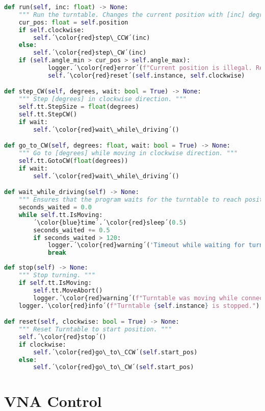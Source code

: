 \begin{lstlisting}[language=Python, caption=Methods for turning the turntable to the wanted position.]
def run(self, inc: float) -> None:
    """ Run the turntable. Changes the current position with [inc] degrees. """
    cur_pos: float = self.position
    if self.clockwise:
        self.´\color{red}step\_CCW´(inc)
    else:
        self.´\color{red}step\_CW´(inc)
    if (self.angle_min > cur_pos > self.angle_max):
            logger.´\color{red}error´(f"Current position is illegal. Resetting: {self.instance}")
            self.´\color{red}reset´(self.instance, self.clockwise)

def step_CW(self, degrees, wait: bool = True) -> None:
    """ Step [degrees] in clockwise direction. """
    self.tt.StepSize = float(degrees)
    self.tt.StepCW()
    if wait:
        self.´\color{red}wait\_while\_driving´()

def go_to_CW(self, degrees: float, wait: bool = True) -> None:
    """ Go to [degrees] while moving in clockwise direction. """
    self.tt.GotoCW(float(degrees))
    if wait:
        self.´\color{red}wait\_while\_driving´()

def wait_while_driving(self) -> None:
    """ Ensures that the program waits for the turntable to reach position before execution further code. """
    seconds_waited = 0.0
    while self.tt.IsMoving:
        ´\color{blue}time´.´\color{red}sleep´(0.5)
        seconds_waited += 0.5
        if seconds_waited > 120:
            logger.´\color{red}warning´('Timeout while waiting for turntable to stop')
            break
\end{lstlisting}

\begin{lstlisting}[language=Python, caption=Method for resetting the turntable to start position.]
def stop(self) -> None:
    """ Stop turning. """
    if self.tt.IsMoving:
        self.tt.MoveAbort()
        logger.´\color{red}warning´(f"Turntable was moving while connection was stopped for {self.instance}.")
    logger.´\color{red}info´(f"Turntable {self.instance} is stopped.")

def reset(self, clockwise: bool = True) -> None:
    """ Reset Turntable to start position. """
    self.´\color{red}stop´()
    if clockwise:
        self.´\color{red}go\_to\_CCW´(self.start_pos)
    else:
        self.´\color{red}go\_to\_CW´(self.start_pos)
\end{lstlisting}

\section{VNA Control}

